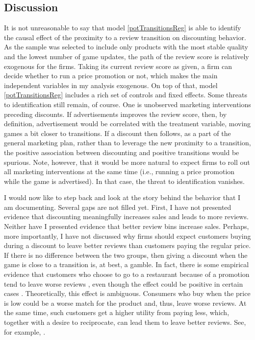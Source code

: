 \documentclass[
  12pt,
  pagebackref]{article}
\begin{document}
\hypertarget{discussion}{%
\subsection{Discussion}\label{discussion}}

It is not unreasonable to say that model \ref{potTransitionsReg} is able
to identify the causal effect of the proximity to a review transition on
discounting behavior. As the sample was selected to include only
products with the most stable quality and the lowest number of game
updates, the path of the review score is relatively exogenous for the
firms. Taking its current review score as given, a firm can decide
whether to run a price promotion or not, which makes the main
independent variables in my analysis exogenous. On top of that, model
\ref{potTransitionsReg} includes a rich set of controls and fixed
effects. Some threats to identification still remain, of course. One is
unobserved marketing interventions preceding discounts. If
advertisements improves the review score, then, by definition,
advertisement would be correlated with the treatment variable, moving
games a bit closer to transitions. If a discount then follows, as a part
of the general marketing plan, rather than to leverage the new proximity
to a transition, the positive association between discounting and
positive transitions would be spurious. Note, however, that it would be
more natural to expect firms to roll out all marketing interventions at
the same time (i.e., running a price promotion while the game is
advertised). In that case, the threat to identification vanishes.

I would now like to step back and look at the story behind the behavior
that I am documenting. Several gaps are not filled yet. First, I have
not presented evidence that discounting meaningfully increases sales and
leads to more reviews. Neither have I presented evidence that better
review bins increase sales. Perhaps, more importantly, I have not
discussed why firms should expect customers buying during a discount to
leave better reviews than customers paying the regular price. If there
is no difference between the two groups, then giving a discount when the
game is close to a transition is, at best, a gamble. In fact, there is
some empirical evidence that customers who choose to go to a restaurant
because of a promotion tend to leave worse reviews
\citep{ByersEtAl12, Li16}, even though the effect could be positive in
certain cases \citep{Li16, ZhuEtAl19}. Theoretically, this effect is
ambiguous. Consumers who buy when the price is low could be a worse
match for the product and, thus, leave worse reviews. At the same time,
such customers get a higher utility from paying less, which, together
with a desire to reciprocate, can lead them to leave better reviews.
See, for example, \citet{AcemogluEtAl19}.
\end{document}

